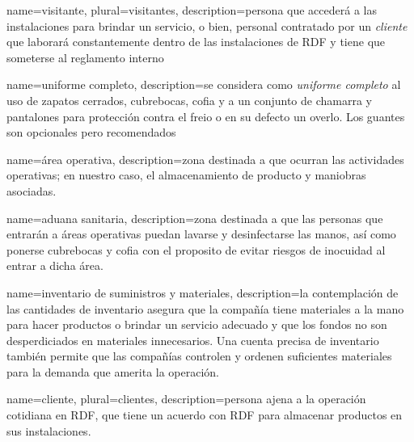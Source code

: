 {
    name=visitante,
    plural=visitantes,
    description={persona que accederá a las instalaciones para brindar un servicio, o bien, personal contratado por un \emph{cliente} que laborará constantemente dentro de las instalaciones de RDF y tiene que someterse al reglamento interno}
}

{
    name=uniforme completo,
    description={se considera como \textit{uniforme completo} al uso de zapatos cerrados, cubrebocas, cofia y a un conjunto de chamarra y pantalones para protección contra el freio o en su defecto un overlo. Los guantes son opcionales pero recomendados}
}

{
    name=área operativa,
    description={zona destinada a que ocurran las actividades operativas; en nuestro caso, el almacenamiento de producto y maniobras asociadas.}
}



{
    name=aduana sanitaria,
    description={zona destinada a que las personas que entrarán a áreas operativas puedan lavarse y desinfectarse las manos, así como ponerse cubrebocas y cofia con el proposito de evitar riesgos de inocuidad al entrar a dicha área.}
}

{
    name=inventario de suministros y materiales,
    description=la contemplación de las cantidades de inventario asegura que la compañía tiene materiales a la mano para hacer productos o brindar un servicio adecuado y que los fondos no son desperdiciados en materiales innecesarios. Una cuenta precisa de inventario también permite que las compañías controlen y ordenen suficientes materiales para la demanda que amerita la operación.
}

{
    name=cliente,
    plural=clientes,
    description={persona ajena a la operación cotidiana en RDF, que tiene un acuerdo con RDF para almacenar productos en sus instalaciones.}
}

